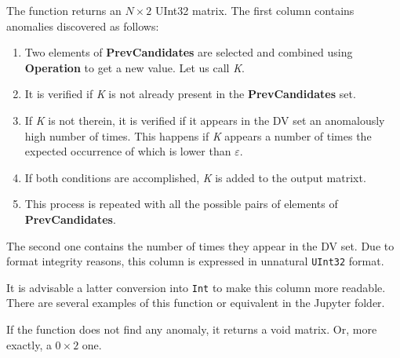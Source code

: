 \begin{itemize}
\begin{itemize}
 		\end{itemize}
 		
 		The function returns an \(N\times 2\) UInt32 matrix. The first column contains anomalies discovered as follows:
 		
 			 \begin{enumerate}
 			 	 \item Two elements of \textbf{PrevCandidates} are selected and combined using \textbf{Operation} to get a new value. Let us call \textit{K}.
 			 	 \item It is verified if \textit{K} is not already present in the \textbf{PrevCandidates} set.
 			 	 \item If \textit{K} is not therein, it is verified if it appears in the DV set an anomalously high number of times. This happens if \textit{K} appears a number of times the expected occurrence of which is lower than \textbf{\(\varepsilon\)}.
 			 	 \item If both conditions are accomplished, \textit{K} is added to the output matrixt.
 			 	 \item This process is repeated with all the possible pairs of elements of \textbf{PrevCandidates}.
 			 \end{enumerate}
 		 
 		The second one contains the number of times they appear in the DV set. Due to format integrity reasons, this column is expressed in unnatural \texttt{UInt32} format. 
 		
 		It is advisable a latter conversion into \texttt{Int} to make this column more readable. There are several examples of this function or equivalent in the Jupyter folder.
 		
 		If the function does not find any anomaly, it returns a void matrix.  Or, more exactly, a \(0\times 2\) one.
 		
 \end{itemize}
